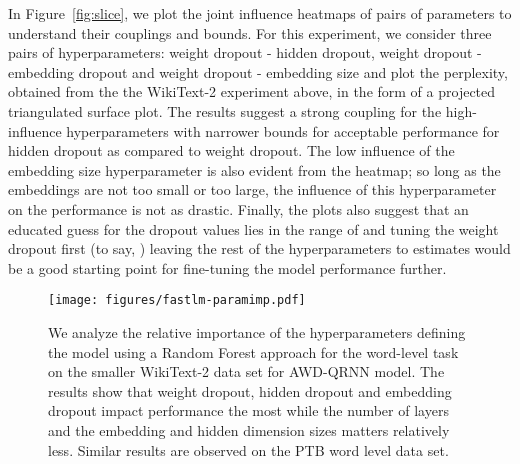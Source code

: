 \documentclass{article}
\begin{document}
In Figure~\ref{fig:slice}, we plot the joint influence heatmaps of pairs of parameters to understand their couplings and bounds. For this experiment, we consider three pairs of hyperparameters: weight dropout - hidden dropout, weight dropout - embedding dropout and  weight dropout - embedding size and plot the perplexity, obtained from the the WikiText-2 experiment above, in the form of a projected triangulated surface plot. The results suggest a strong coupling for the high-influence hyperparameters with narrower bounds for acceptable performance for hidden dropout as compared to weight dropout. The low influence of the embedding size hyperparameter is also evident from the heatmap; so long as the embeddings are not too small or too large, the influence of this hyperparameter on the performance is not as drastic. Finally, the plots also suggest that an educated guess for the dropout values lies in the range of  and tuning the weight dropout first (to say, ) leaving the rest of the hyperparameters to estimates would be a good starting point for fine-tuning the model performance further. 

\begin{figure}
\centering
\texttt{[image: figures/fastlm-paramimp.pdf]}
\caption{
We analyze the relative importance of the hyperparameters defining the model using a Random Forest approach for the word-level task on the smaller WikiText-2 data set for AWD-QRNN model. The results show that weight dropout, hidden dropout and embedding dropout impact performance the most while the number of layers and the embedding and hidden dimension sizes matters relatively less. Similar results are observed on the PTB word level data set. 
}
\label{fig:hyperimp}
\end{figure}
\end{document}
